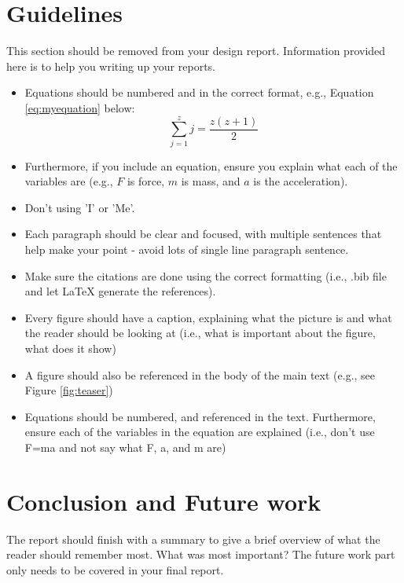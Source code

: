 \documentclass[conference,backref=page]{acmsiggraph}
\begin{document}
\clearpage
\section{Guidelines}
This section should be removed from your design report. Information provided here is to help you writing up your reports.

\begin{itemize}
\item Equations should be numbered and in the correct format, e.g., Equation \ref{eq:myequation} below:
\begin{equation} \label{eq:myequation}
 \sum_{j=1}^{z} j = \frac{z(z+1)}{2}
\end{equation}
\item Furthermore, if you include an equation, ensure you explain what each of the variables are (e.g., $F$ is force, $m$ is mass, and $a$ is the acceleration).
\item Don't using 'I' or 'Me'.
\item Each paragraph should be clear and focused, with multiple sentences that help make your point - avoid lots of single line paragraph sentence.
\item Make sure the citations are done using the correct formatting (i.e., .bib file and let LaTeX generate the references).
\item Every figure should have a caption, explaining what the picture is and what the reader should be looking at (i.e., what is important about the figure, what does it show)
\item A figure should also be referenced in the body of the main text (e.g., see Figure \ref{fig:teaser})
\item Equations should be numbered, and referenced in the text. Furthermore, ensure each of the variables in the equation are explained (i.e., don't use F=ma and not say what F, a, and m are)
\end{itemize}


\section{Conclusion and Future work}
The report should finish with a summary to give a brief overview of what the reader should remember most.  What was most important? The future work part only needs to be covered in your final report.






\end{document}
